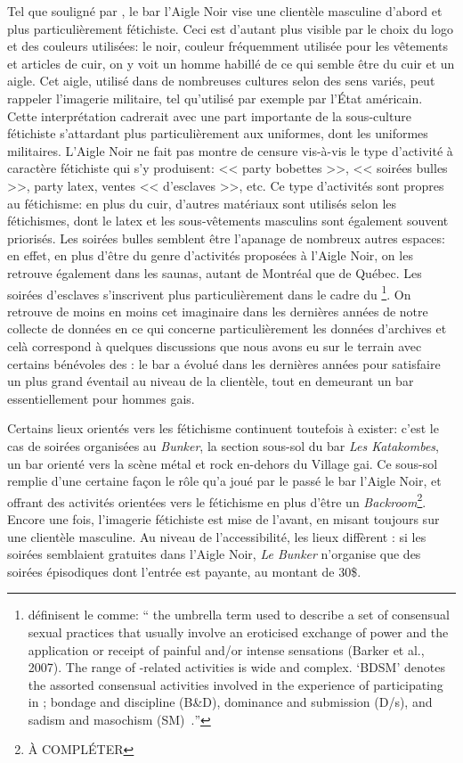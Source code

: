 Tel que souligné par \citet{Giraud2013a}, le bar l'Aigle Noir vise une clientèle masculine d'abord et plus particulièrement fétichiste. 
Ceci est d'autant plus visible par le choix du logo et des couleurs utilisées: le noir, couleur fréquemment utilisée pour les vêtements et articles de cuir, on y voit un homme habillé de ce qui semble être du cuir et un aigle. 
Cet aigle, utilisé dans de nombreuses cultures selon des sens variés, peut rappeler l'imagerie militaire, tel qu'utilisé par exemple par l'État américain. 
Cette interprétation cadrerait avec une part importante de la sous-culture fétichiste s'attardant plus particulièrement aux uniformes, dont les uniformes militaires. 
L'Aigle Noir ne fait pas montre de censure vis-à-vis le type d'activité à caractère fétichiste qui s'y produisent: << party bobettes >>, << soirées bulles >>, party latex, ventes << d'esclaves >>, etc. 
Ce type d'activités sont propres au fétichisme: en plus du cuir, d'autres matériaux sont utilisés selon les fétichismes, dont le latex et les sous-vêtements masculins sont également souvent priorisés. 
Les soirées bulles semblent être l'apanage de nombreux autres espaces: en effet, en plus d'être du genre d'activités proposées à l'Aigle Noir, on les retrouve également dans les saunas, autant de Montréal que de Québec. 
Les soirées d'esclaves s'inscrivent plus particulièrement dans le cadre du \bdsm{}\footnote{\citeauthor{Turley2015} définisent le \bdsm{} comme:   \foreignquote{english}{\textelp{} the umbrella term   used to describe a set of consensual sexual practices that usually involve an   eroticised exchange of power and the application or receipt of painful and/or   intense sensations (Barker et al., 2007). 
The range of \bdsm{}-related activities   is wide and complex. 
‘BDSM’ denotes the assorted consensual activities   involved in the experience of participating in \bdsm{}; bondage and discipline   (B\&D), dominance and submission (D/s), and sadism and masochism   (SM)~\citeyearpar[24]{Turley2015}.}}. 
On retrouve de moins en moins cet imaginaire dans les dernières années de notre collecte de données en ce qui concerne particulièrement les données d'archives et celà correspond à quelques discussions que nous avons eu sur le terrain avec certains bénévoles des \agq{}: le bar a évolué dans les dernières années pour satisfaire un plus grand éventail au niveau de la clientèle, tout en demeurant un bar essentiellement pour hommes gais. 

Certains lieux orientés vers les fétichisme continuent toutefois à exister: c'est le cas de soirées organisées au \emph{Bunker}, la section sous-sol du bar \emph{Les Katakombes}, un bar orienté vers la scène métal et rock en-dehors du Village gai. 
Ce sous-sol remplie d'une certaine façon le rôle qu'a joué par le passé le bar l'Aigle Noir, et offrant des activités orientées vers le fétichisme en plus d'être un \emph{Backroom}\footnote{À COMPLÉTER}. 
Encore une fois, l'imagerie fétichiste est mise de l'avant, en misant toujours sur une clientèle masculine. 
Au niveau de l'accessibilité, les lieux diffèrent : si les soirées semblaient gratuites dans l'Aigle Noir, \emph{Le Bunker} n'organise que des soirées épisodiques dont l'entrée est payante, au montant de 30\$. 

